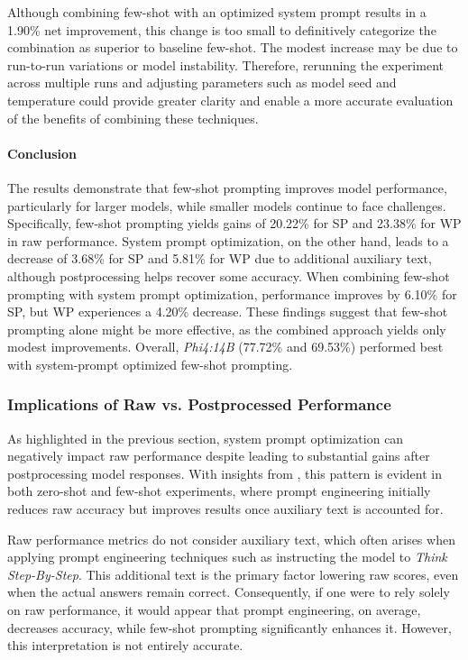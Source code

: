 Although combining few-shot with an optimized system prompt results in a 1.90\% net improvement, this change is too small to definitively categorize the combination as superior to baseline few-shot. The modest increase may be due to run-to-run variations or model instability. Therefore, rerunning the experiment across multiple runs and adjusting parameters such as model seed and temperature could provide greater clarity and enable a more accurate evaluation of the benefits of combining these techniques.

\paragraph{Conclusion}
The results demonstrate that few-shot prompting improves model performance, particularly for larger models, while smaller models continue to face challenges. Specifically, few-shot prompting yields gains of 20.22\% for \acf{SP} and 23.38\% for \acf{WP} in raw performance. System prompt optimization, on the other hand, leads to a decrease of 3.68\% for \ac{SP} and 5.81\% for \ac{WP} due to additional auxiliary text, although postprocessing helps recover some accuracy. When combining few-shot prompting with system prompt optimization, performance improves by 6.10\% for \ac{SP}, but \ac{WP} experiences a 4.20\% decrease. These findings suggest that few-shot prompting alone might be more effective, as the combined approach yields only modest improvements. Overall, \textit{Phi4:14B} (77.72\% and 69.53\%) performed best with system-prompt optimized few-shot prompting.

\subsubsection{Implications of Raw vs. Postprocessed Performance}
\label{par:raw-vs-post-performance}

As highlighted in the previous section, system prompt optimization can negatively impact raw performance despite leading to substantial gains after postprocessing model responses. With insights from , this pattern is evident in both zero-shot and few-shot experiments, where prompt engineering initially reduces raw accuracy but improves results once auxiliary text is accounted for.

Raw performance metrics do not consider auxiliary text, which often arises when applying prompt engineering techniques such as instructing the model to \textit{Think Step-By-Step}. This additional text is the primary factor lowering raw scores, even when the actual answers remain correct. Consequently, if one were to rely solely on raw performance, it would appear that prompt engineering, on average, decreases accuracy, while few-shot prompting significantly enhances it. However, this interpretation is not entirely accurate.

